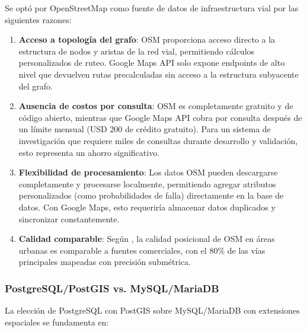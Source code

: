 \documentclass[conference]{IEEEtran}
\begin{document}
Se optó por OpenStreetMap como fuente de datos de infraestructura vial por las siguientes razones:

\begin{enumerate}
    \item \textbf{Acceso a topología del grafo}: OSM proporciona acceso directo a la estructura de nodos y aristas de la red vial, permitiendo cálculos personalizados de ruteo. Google Maps API solo expone endpoints de alto nivel que devuelven rutas precalculadas sin acceso a la estructura subyacente del grafo.

    \item \textbf{Ausencia de costos por consulta}: OSM es completamente gratuito y de código abierto, mientras que Google Maps API cobra por consulta después de un límite mensual (USD 200 de crédito gratuito). Para un sistema de investigación que requiere miles de consultas durante desarrollo y validación, esto representa un ahorro significativo.

    \item \textbf{Flexibilidad de procesamiento}: Los datos OSM pueden descargarse completamente y procesarse localmente, permitiendo agregar atributos personalizados (como probabilidades de falla) directamente en la base de datos. Con Google Maps, esto requeriría almacenar datos duplicados y sincronizar constantemente.

    \item \textbf{Calidad comparable}: Según \citet{haklay2010}, la calidad posicional de OSM en áreas urbanas es comparable a fuentes comerciales, con el 80\% de las vías principales mapeadas con precisión submétrica.
\end{enumerate}

\subsubsection{PostgreSQL/PostGIS vs. MySQL/MariaDB}

La elección de PostgreSQL con PostGIS sobre MySQL/MariaDB con extensiones espaciales se fundamenta en:
\end{document}
